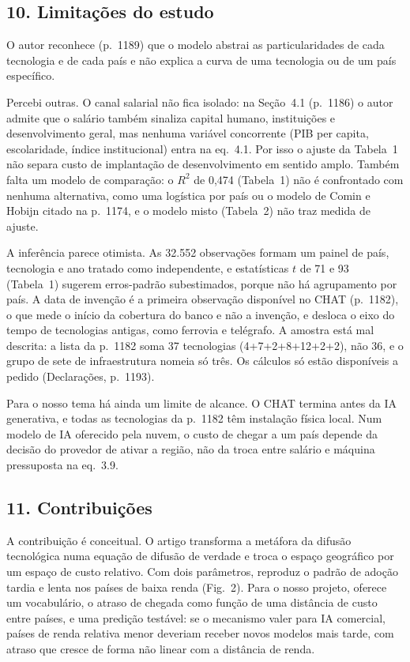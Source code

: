 \subsection*{10. Limitações do estudo}
O autor reconhece (p.~1189) que o modelo abstrai as particularidades de cada tecnologia e de cada
país e não explica a curva de uma tecnologia ou de um país específico.

Percebi outras. O canal salarial não fica isolado: na Seção~4.1 (p.~1186) o autor admite que o
salário também sinaliza capital humano, instituições e desenvolvimento geral, mas nenhuma variável
concorrente (PIB per capita, escolaridade, índice institucional) entra na eq.~4.1. Por isso o ajuste
da Tabela~1 não separa custo de implantação de desenvolvimento em sentido amplo. Também falta um
modelo de comparação: o $R^2$ de 0,474 (Tabela~1) não é confrontado com nenhuma alternativa, como
uma logística por país ou o modelo de Comin e Hobijn citado na p.~1174, e o modelo misto (Tabela~2)
não traz medida de ajuste.

A inferência parece otimista. As 32.552 observações formam um painel de país, tecnologia e ano
tratado como independente, e estatísticas $t$ de 71 e 93 (Tabela~1) sugerem erros-padrão
subestimados, porque não há agrupamento por país. A data de invenção é a primeira observação
disponível no CHAT (p.~1182), o que mede o início da cobertura do banco e não a invenção, e desloca
o eixo do tempo de tecnologias antigas, como ferrovia e telégrafo. A amostra está mal descrita: a
lista da p.~1182 soma 37 tecnologias (4+7+2+8+12+2+2), não 36, e o grupo de sete de infraestrutura
nomeia só três. Os cálculos só estão disponíveis a pedido (Declarações, p.~1193).

Para o nosso tema há ainda um limite de alcance. O CHAT termina antes da IA generativa, e todas as
tecnologias da p.~1182 têm instalação física local. Num modelo de IA oferecido pela nuvem, o custo
de chegar a um país depende da decisão do provedor de ativar a região, não da troca entre salário e
máquina pressuposta na eq.~3.9.

\subsection*{11. Contribuições}
A contribuição é conceitual. O artigo transforma a metáfora da difusão tecnológica numa equação de
difusão de verdade e troca o espaço geográfico por um espaço de custo relativo. Com dois
parâmetros, reproduz o padrão de adoção tardia e lenta nos países de baixa renda (Fig.~2). Para o
nosso projeto, oferece um vocabulário, o atraso de chegada como função de uma distância de custo
entre países, e uma predição testável: se o mecanismo valer para IA comercial, países de renda
relativa menor deveriam receber novos modelos mais tarde, com atraso que cresce de forma não linear
com a distância de renda.

